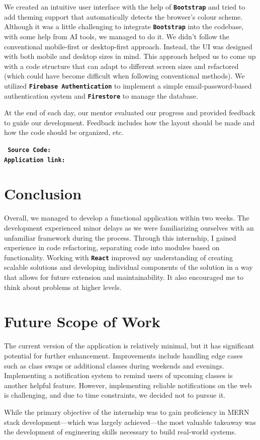\documentclass[12pt, a4paper]{article}
\newcommand{\ttbold}[1]{\textbf{\texttt{#1}}}
\begin{document}
We created an intuitive user interface with the help of \ttbold{Bootstrap} and tried to add theming support that automatically detects the browser's colour scheme. Although it was a little challenging to integrate \ttbold{Bootstrap} into the codebase, with some help from AI tools, we managed to do it. We didn't follow the conventional mobile-first or desktop-first approach. Instead, the UI was designed with both mobile and desktop sizes in mind. This approach helped us to come up with a code structure that can adapt to different screen sizes and refactored (which could have become difficult when following conventional methods). We utilized \ttbold{Firebase Authentication} to implement a simple email-password-based authentication system and \ttbold{Firestore} to manage the database.

At the end of each day, our mentor evaluated our progress and provided feedback to guide our development. Feedback includes how the layout should be made and how the code should be organized, etc.
\begin{framed}
	\noindent
	\ttbold{%
		Source Code: \href{https://github.com/Roopesh2/attendence-tracker-cu/}{\color{blue}{https://github.com/Roopesh2/attendence-tracker-cu/}}\\
		Application link: \href{https://attendance-tracker-364b5.web.app/}{\color{blue}{https://attendance-tracker-364b5.web.app/}}
	}
\end{framed}
\section*{Conclusion}
Overall, we managed to develop a functional application within two weeks. The development experienced minor delays as we were familiarizing ourselves with an unfamiliar framework during the process. Through this internship, I gained experience in code refactoring, separating code into modules based on functionality. Working with \ttbold{React} improved my understanding of creating scalable solutions and developing individual components of the solution in a way that allows for future extension and maintainability. It also encouraged me to think about problems at higher levels.

\section*{Future Scope of Work}
The current version of the application is relatively minimal, but it has significant potential for further enhancement. Improvements include handling edge cases such as class swaps or additional classes during weekends and evenings. Implementing a notification system to remind users of upcoming classes is another helpful feature. However, implementing reliable notifications on the web is challenging, and due to time constraints, we decided not to pursue it.

While the primary objective of the internship was to gain proficiency in MERN stack development—which was largely achieved—the most valuable takeaway was the development of engineering skills necessary to build real-world systems.
\end{document}
